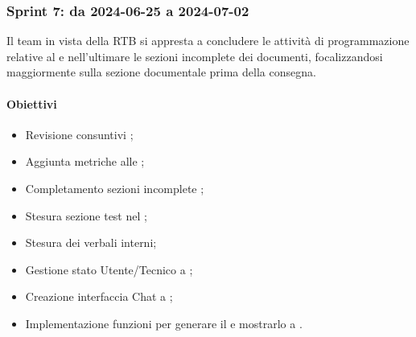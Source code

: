 \subsubsection{Sprint 7: da 2024-06-25 a 2024-07-02}
Il team in vista della RTB si appresta a concludere le attività di programmazione relative al  e nell'ultimare le sezioni incomplete dei documenti, focalizzandosi maggiormente sulla sezione documentale prima della consegna.


\paragraph{Obiettivi}
\begin{itemize}
  \item Revisione consuntivi \PdP;
  \item Aggiunta metriche alle \NdP;
  \item Completamento sezioni incomplete \NdP;
  \item Stesura sezione test nel \PdQ;
  \item Stesura dei verbali interni;
  \item Gestione stato Utente/Tecnico a ;
  \item Creazione interfaccia Chat a ;
  \item Implementazione funzioni per generare il  e mostrarlo a .
\end{itemize}

\vspace{0.5\baselineskip}
\par [Inserire Gantt]
